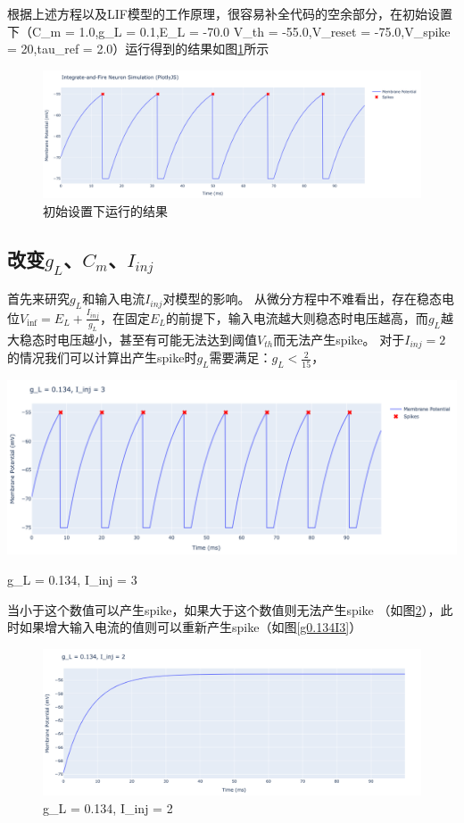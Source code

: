 \documentclass[nols, a4paper]{tufte-handout}
\begin{document}
根据上述方程以及LIF模型的工作原理，很容易补全代码的空余部分，在初始设置下（C\_m = 1.0,g\_L = 0.1,E\_L = -70.0
V\_th = -55.0,V\_reset = -75.0,V\_spike = 20,tau\_ref = 2.0）运行得到的结果如图\ref{LIF_default}所示

\begin{figure}
  \includegraphics[width=\linewidth]{image/LIF_default.png} 
  \caption{初始设置下运行的结果}
  \label{LIF_default}
\end{figure}


\subsection{改变$g_L$、$C_m$、$I_{inj}$}

首先来研究$g_L$和输入电流$I_{inj}$对模型的影响。
从微分方程中不难看出，存在稳态电位$V_{\inf} = E_L + \frac{I_{inj}}{g_L}$，在固定$E_L$的前提下，输入电流越大则稳态时电压越高，而$g_L$越大稳态时电压越小，甚至有可能无法达到阈值$V_{th}$而无法产生spike。
对于$I_{inj} = 2$的情况我们可以计算出产生spike时$g_L$需要满足：$g_L < \frac{2}{15}$，
\begin{marginfigure}
  \includegraphics[width=\linewidth]{image/g0134i3.png} 
  \caption{g\_L = 0.134, I\_inj = 3}
  \label{g0.134I3}
\end{marginfigure}
当小于这个数值可以产生spike，如果大于这个数值则无法产生spike （如图\ref{g0.134I2}），此时如果增大输入电流的值则可以重新产生spike（如图\ref{g0.134I3}）

\begin{figure}
  \includegraphics[width = 0.94\linewidth]{image/g0134i2.png} 
  \caption{g\_L = 0.134, I\_inj = 2}
  \label{g0.134I2}
\end{figure}
\end{document}

